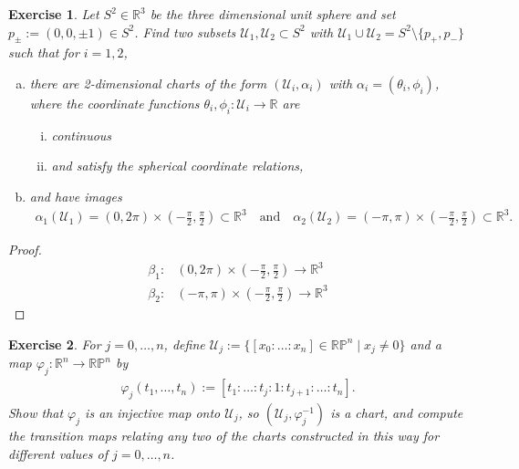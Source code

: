 \documentclass{book}
\theoremstyle{custom_definition}
\newtheorem{exercise}{Exercise}
\theoremstyle{custom_theorem}
\begin{document}
    \begin{exercise}
        Let \(S^2 \in \mathbb{R}^3\) be the three dimensional unit sphere and set \(p_{\pm} := (0, 0, \pm 1) \in S^2\). Find two subsets \(\mathcal{U}_1, \mathcal{U}_2 \subset S^2\) with \(\mathcal{U}_1 \cup \mathcal{U}_2 = S^2 \setminus \{p_+, p_-\}\) such that for \(i = 1, 2\),
        \begin{enumerate}[a)]
            \item there are 2-dimensional charts of the form \((\mathcal{U}_i, \alpha_i)\) with \(\alpha_i = (\theta_i, \phi_i)\), where the coordinate functions \(\theta_i, \phi_i: \mathcal{U}_i \longrightarrow \mathbb{R}\) are
            \begin{enumerate}[i)]
                \item continuous
                \item and satisfy the spherical coordinate relations,
            \end{enumerate}
            \item and have images
            \begin{align}
                \alpha_1(\mathcal{U}_1) = (0, 2 \pi) \times (-\frac{\pi}{2}, \frac{\pi}{2}) \subset \mathbb{R}^3 \quad \text{and} \quad \alpha_2(\mathcal{U}_2) = (-\pi, \pi) \times (-\frac{\pi}{2}, \frac{\pi}{2}) \subset \mathbb{R}^3 \text{.}
            \end{align}
        \end{enumerate}
    \end{exercise}
    \begin{proof} %
        \begin{align}
            \beta_1:& (0, 2 \pi) \times \left(-\frac{\pi}{2}, \frac{\pi}{2}\right) \longrightarrow \mathbb{R}^3 \\
            \beta_2:& (-\pi, \pi) \times \left(-\frac{\pi}{2}, \frac{\pi}{2}\right) \longrightarrow \mathbb{R}^3
        \end{align}
    \end{proof}
    \begin{exercise}
        For \(j = 0, \ldots, n\), define \(\mathcal{U}_j := \{[x_0 : \ldots : x_n] \in \mathbb{R}\mathbb{P}^n \mid x_j \neq 0\}\) and a map \(\varphi_j : \mathbb{R}^n \longrightarrow \mathbb{R}\mathbb{P}^n\) by
        \begin{align}
            \varphi_j (t_1, \ldots, t_n) := [t_1 : \ldots : t_j : 1 : t_{j+1} : \ldots : t_n] \text{.}
        \end{align}
        Show that \(\varphi_j\) is an injective map onto \(\mathcal{U}_j\), so \((\mathcal{U}_j, \varphi_j^{-1})\) is a chart, and compute the transition maps relating any two of the charts constructed in this way for different values of \(j = 0, \ldots, n\).
    \end{exercise}
\end{document}
